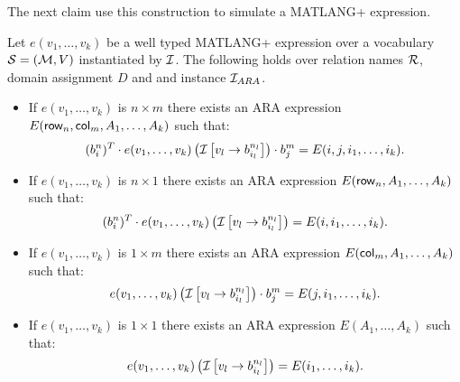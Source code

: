 The next claim use this construction to simulate a MATLANG+ expression.

\begin{prop}

Let $e(v_1,\ldots, v_k)$ be a well typed MATLANG+ expression over a vocabulary $\mathcal{S}=(\mathcal{M},V)$ instantiated by $\mathcal{I}$. The following holds over relation names $\mathcal{R}$, domain assignment $D$ and and instance $\mathcal{I}_{ARA}$.
\begin{itemize}
	\item If $e(v_1,\ldots, v_k)$ is $n\times m$ there exists an ARA expression $E(\mathsf{row}_n, \mathsf{col}_m, A_1,\ldots, A_k)$ such that: $$(b_i^n)^T\cdot e(v_1,\ldots,v_k)\left(\mathcal{I}\left[ v_l\rightarrow b_{i_l}^{n_l}\right]\right)\cdot b_j^m=E(i,j,i_1,\ldots, i_k).$$
	\item If $e(v_1,\ldots, v_k)$ is $n\times 1$ there exists an ARA expression $E(\mathsf{row}_n, A_1,\ldots, A_k)$ such that: $$(b_i^n)^T\cdot e(v_1,\ldots,v_k)\left(\mathcal{I}\left[ v_l\rightarrow b_{i_l}^{n_l}\right]\right)=E(i,i_1,\ldots, i_k).$$
	\item If $e(v_1,\ldots, v_k)$ is $1\times m$ there exists an ARA expression $E(\mathsf{col}_m, A_1,\ldots, A_k)$ such that: $$e(v_1,\ldots,v_k)\left(\mathcal{I}\left[ v_l\rightarrow b_{i_l}^{n_l}\right]\right)\cdot b_j^m=E(j,i_1,\ldots, i_k).$$
	\item If $e(v_1,\ldots, v_k)$ is $1\times 1$ there exists an ARA expression $E(A_1,\ldots, A_k)$ such that: $$e(v_1,\ldots,v_k)\left(\mathcal{I}\left[ v_l\rightarrow b_{i_l}^{n_l}\right]\right)=E(i_1,\ldots, i_k).$$
\end{itemize}

\end{prop}
